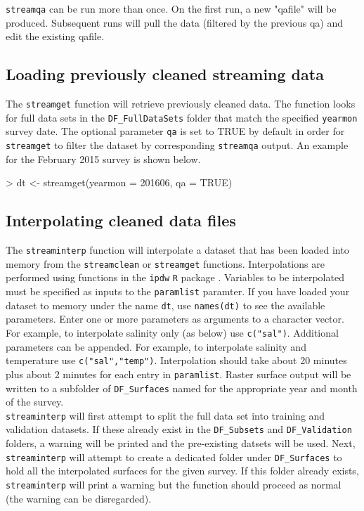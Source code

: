 \documentclass[12pt]{article}
\begin{document}
\texttt{streamqa} can be run more than once. On the first run, a new "qafile" will be produced. Subsequent runs will pull the data (filtered by the previous qa) and edit the existing qafile.

\subsection{Loading previously cleaned streaming data}

The \texttt{streamget} function will retrieve previously cleaned data. The function looks for full data sets in the \verb|DF_FullDataSets| folder that match the specified \texttt{yearmon} survey date. The optional parameter \texttt{qa} is set to TRUE by default in order for \texttt{streamget} to filter the dataset by corresponding \texttt{streamqa} output. An example for the February 2015 survey is shown below.

\begin{Schunk}
\begin{Sinput}
> dt <- streamget(yearmon = 201606, qa = TRUE)
\end{Sinput}
\end{Schunk}

\subsection{Interpolating cleaned data files}

The \texttt{streaminterp} function will interpolate a dataset that has been loaded into memory from the \texttt{streamclean} or \texttt{streamget} functions. Interpolations are performed using functions in the \texttt{ipdw} \texttt{R} package \citep{ipdw}. Variables to be interpolated must be specified as inputs to the \texttt{paramlist} paramter. If you have loaded your dataset to memory under the name \texttt{dt}, use \texttt{names(dt)} to see the available parameters. Enter one or more parameters as arguments to a character vector. For example, to interpolate salinity only (as below) use \texttt{c("sal")}. Additional parameters can be appended. For example, to interpolate salinity and temperature use \texttt{c("sal","temp")}. Interpolation should take about 20 minutes plus about 2 minutes for each entry in \texttt{paramlist}. Raster surface output will be written to a subfolder of \verb|DF_Surfaces| named for the appropriate year and month of the survey.\\

\texttt{streaminterp} will first attempt to split the full data set into training and validation datasets. If these already exist in the \verb|DF_Subsets| and \verb|DF_Validation| folders, a warning will be printed and the pre-existing datsets will be used. Next, \texttt{streaminterp} will attempt to create a dedicated folder under \verb|DF_Surfaces| to hold all the interpolated surfaces for the given survey. If this folder already exists, \texttt{streaminterp} will print a warning but the function should proceed as normal (the warning can be disregarded).\\
\end{document}
